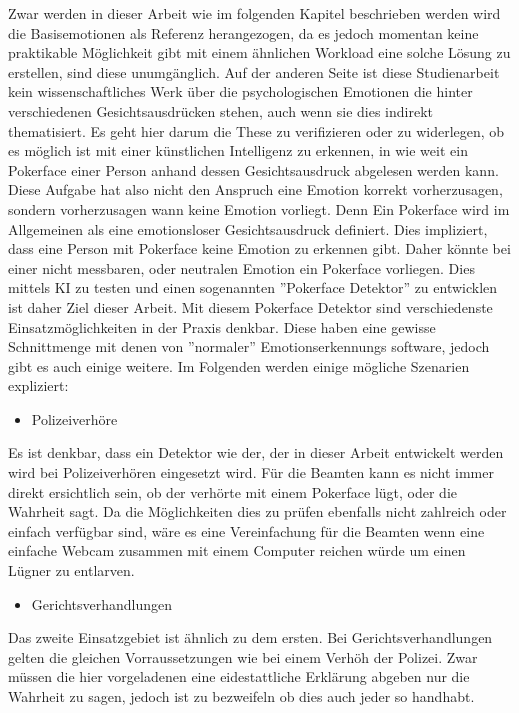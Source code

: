 \documentclass[12pt, a4paper]{scrbook}
\begin{document}
Zwar werden in dieser Arbeit wie im folgenden Kapitel beschrieben werden wird die Basisemotionen als Referenz herangezogen, da es jedoch momentan keine praktikable Möglichkeit gibt mit einem ähnlichen Workload eine solche Lösung zu erstellen, sind diese unumgänglich. Auf der anderen Seite ist diese Studienarbeit kein wissenschaftliches Werk über die psychologischen Emotionen die hinter verschiedenen Gesichtsausdrücken stehen, auch wenn sie dies indirekt thematisiert. Es geht hier darum die These zu verifizieren oder zu widerlegen, ob es möglich ist mit einer künstlichen Intelligenz zu erkennen, in wie weit ein Pokerface einer Person anhand dessen Gesichtsausdruck abgelesen werden kann. Diese Aufgabe hat also nicht den Anspruch eine Emotion korrekt vorherzusagen, sondern vorherzusagen wann keine Emotion vorliegt. Denn Ein Pokerface wird im Allgemeinen als eine emotionsloser Gesichtsausdruck definiert. Dies impliziert, dass eine Person mit Pokerface keine Emotion zu erkennen gibt. Daher könnte bei einer nicht messbaren, oder neutralen Emotion ein Pokerface vorliegen. Dies mittels KI zu testen und einen sogenannten ''Pokerface Detektor'' zu entwicklen ist daher Ziel dieser Arbeit. Mit diesem Pokerface Detektor sind verschiedenste Einsatzmöglichkeiten in der Praxis denkbar. Diese haben eine gewisse Schnittmenge mit denen von ''normaler'' Emotionserkennungs software, jedoch gibt es auch einige weitere. Im Folgenden werden einige mögliche Szenarien expliziert:
\begin{itemize}
	\item{Polizeiverhöre}
\end{itemize}
Es ist denkbar, dass ein Detektor wie der, der in dieser Arbeit entwickelt werden wird bei Polizeiverhören eingesetzt wird. Für die Beamten kann es nicht immer direkt ersichtlich sein, ob der verhörte mit einem Pokerface lügt, oder die Wahrheit sagt. Da die Möglichkeiten dies zu prüfen ebenfalls nicht zahlreich oder einfach verfügbar sind, wäre es eine Vereinfachung für die Beamten wenn eine einfache Webcam zusammen mit einem Computer reichen würde um einen Lügner zu entlarven.
\begin{itemize}
	\item{Gerichtsverhandlungen}
\end{itemize}
Das zweite Einsatzgebiet ist ähnlich zu dem ersten. Bei Gerichtsverhandlungen gelten die gleichen Vorraussetzungen wie bei einem Verhöh der Polizei. Zwar müssen die hier vorgeladenen eine eidestattliche Erklärung abgeben nur die Wahrheit zu sagen, jedoch ist zu bezweifeln ob dies auch jeder so handhabt. 
\end{document}
